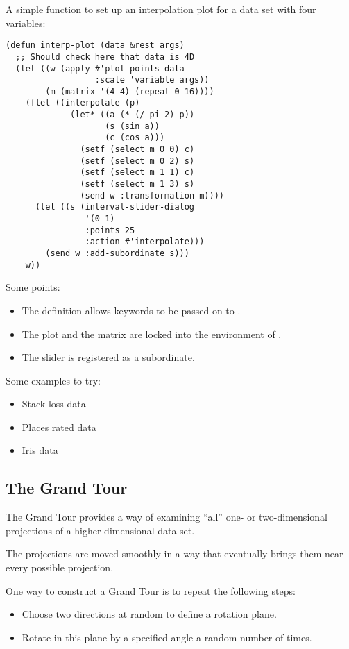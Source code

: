 \begin{slide}{}
A simple function to set up an interpolation plot for a data set with
four variables:
{\Large
\begin{verbatim}
(defun interp-plot (data &rest args)
  ;; Should check here that data is 4D
  (let ((w (apply #'plot-points data
                  :scale 'variable args))
        (m (matrix '(4 4) (repeat 0 16))))
    (flet ((interpolate (p)
             (let* ((a (* (/ pi 2) p))
                    (s (sin a))
                    (c (cos a)))
               (setf (select m 0 0) c)
               (setf (select m 0 2) s)
               (setf (select m 1 1) c)
               (setf (select m 1 3) s)
               (send w :transformation m))))
      (let ((s (interval-slider-dialog
                '(0 1) 
                :points 25 
                :action #'interpolate)))
        (send w :add-subordinate s)))
    w))
\end{verbatim}}
\end{slide}

\begin{slide}{}
Some points:
\begin{itemize}
\item
The definition allows keywords to be passed on to .
\item
The plot  and the matrix  are locked into the
environment of .
\item
The slider is registered as a subordinate.
\end{itemize}
Some examples to try:
\begin{itemize}
\item Stack loss data
\item Places rated data
\item Iris data
\end{itemize}
\end{slide}

\begin{slide}{}
\subsection{The Grand Tour}
The Grand Tour provides a way of examining ``all'' one- or two-dimensional
projections of a higher-dimensional data set.

The projections are moved smoothly in a way that eventually brings them
near every possible projection.

One way to construct a Grand Tour is to repeat the following steps:
\begin{itemize}
\item Choose two directions at random to define a rotation plane.
\item Rotate in this plane by a specified angle a random number of times.
\end{itemize}
\end{slide}

